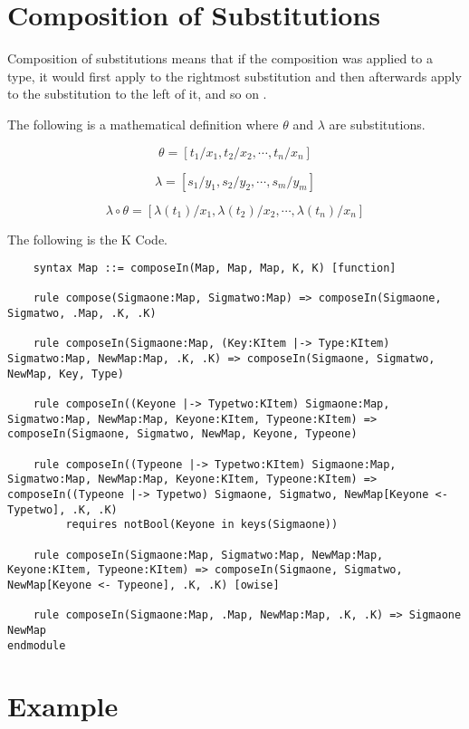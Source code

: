 \section{Composition of Substitutions}

Composition of substitutions means that if the composition was applied to a type, it would first apply to the rightmost substitution and then afterwards apply to the substitution to the left of it, and so on \cite{Infer:TypeSub}.

The following is a mathematical definition where $\theta$ and $\lambda$ are substitutions.

$$ \theta = [t_1 / x_1 , t_2 / x_2 , \cdots , t_n / x_n] $$

$$ \lambda = [s_1 / y_1 , s_2 / y_2 , \cdots , s_m / y_m] $$

$$ \lambda \circ \theta = [ \lambda(t_1) /x_1 , \lambda(t_2) / x_2, \cdots, \lambda(t_n) / x_n]$$

The following is the K Code.

\begin{lstlisting}
    syntax Map ::= composeIn(Map, Map, Map, K, K) [function]

    rule compose(Sigmaone:Map, Sigmatwo:Map) => composeIn(Sigmaone, Sigmatwo, .Map, .K, .K)

    rule composeIn(Sigmaone:Map, (Key:KItem |-> Type:KItem) Sigmatwo:Map, NewMap:Map, .K, .K) => composeIn(Sigmaone, Sigmatwo, NewMap, Key, Type)

    rule composeIn((Keyone |-> Typetwo:KItem) Sigmaone:Map, Sigmatwo:Map, NewMap:Map, Keyone:KItem, Typeone:KItem) => composeIn(Sigmaone, Sigmatwo, NewMap, Keyone, Typeone)

    rule composeIn((Typeone |-> Typetwo:KItem) Sigmaone:Map, Sigmatwo:Map, NewMap:Map, Keyone:KItem, Typeone:KItem) => composeIn((Typeone |-> Typetwo) Sigmaone, Sigmatwo, NewMap[Keyone <- Typetwo], .K, .K)
         requires notBool(Keyone in keys(Sigmaone))

    rule composeIn(Sigmaone:Map, Sigmatwo:Map, NewMap:Map, Keyone:KItem, Typeone:KItem) => composeIn(Sigmaone, Sigmatwo, NewMap[Keyone <- Typeone], .K, .K) [owise]

    rule composeIn(Sigmaone:Map, .Map, NewMap:Map, .K, .K) => Sigmaone NewMap
endmodule
\end{lstlisting}

\section{Example}

